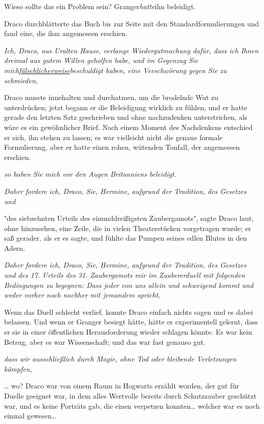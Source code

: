 {Wieso sollte das ein Problem sein? Granger\emph{hatte}ihn beleidigt.

Draco durchblätterte das Buch bis zur Seite mit den Standardformulierungen und fand eine, die ihm angemessen erschien.

\emph{Ich, Draco, aus Uralten Hause, verlange Wiedergutmachung dafür, dass ich Ihnen dreimal aus gutem Willen geholfen habe, und im Gegenzug Sie mich\uline{fälschlicherweise}beschuldigt haben, eine Verschwörung gegen Sie zu schmieden,}

Draco musste innehalten und durchatmen, um die brodelnde Wut zu unterdrücken; jetzt begann er die Beleidigung wirklich zu fühlen, und er hatte gerade den letzten Satz geschrieben und ohne nachzudenken unterstrichen, als wäre es ein gewöhnlicher Brief. Nach einem Moment des Nachdenkens entschied er sich, ihn stehen zu lassen; es war vielleicht nicht die genaue formale Formulierung, aber er hatte einen rohen, wütenden Tonfall, der angemessen erschien.

\emph{so haben Sie mich vor den Augen Britanniens beleidigt.}

\emph{Daher fordere ich, Draco, Sie, Hermine, aufgrund der Tradition, des Gesetzes und}

"des siebzehnten Urteils des einunddreißigsten Zaubergamots", sagte Draco laut, ohne hinzusehen, eine Zeile, die in vielen Theaterstücken vorgetragen wurde; er saß gerader, als er es sagte, und fühlte das Pumpen seines edlen Blutes in den Adern.

\emph{Daher fordere ich, Draco, Sie, Hermine, aufgrund der Tradition, des Gesetzes und des 17. Urteils des 31. Zaubergamots mir im Zaubererduell mit folgenden Bedingungen zu begegnen: Dass jeder von uns allein und schweigend kommt und weder vorher noch nachher mit jemandem spricht,}

Wenn das Duell schlecht verlief, konnte Draco einfach nichts sagen und es dabei belassen. Und wenn er Granger besiegt hätte, hätte er experimentell gelernt, dass er sie in einer öffentlichen Herausforderung wieder schlagen könnte. Es war kein Betrug, aber es war Wissenschaft; und das war fast genauso gut.

\emph{dass wir ausschließlich durch Magie, ohne Tod oder bleibende Verletzungen kämpfen},

… wo? Draco war von einem Raum in Hogwarts erzählt worden, der gut für Duelle geeignet war, in dem alles Wertvolle bereits durch Schutzzauber geschützt war, und es keine Porträts gab, die einen verpetzen konnten… welcher war es noch einmal gewesen…

}
